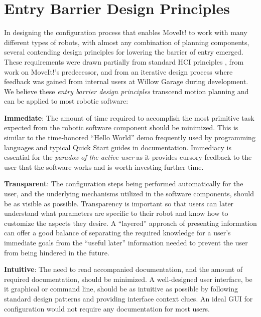 \documentclass[10pt,journal,compsoc]{joser1}
\begin{document}
{%
\section{Entry Barrier Design Principles}
\label{sec::requirements}

In designing the configuration process that enables MoveIt! to work with many
different types of robots, with almost any combination of planning components,
several contending design principles for lowering the barrier of entry emerged.
These requirements were drawn partially from standard HCI principles
\cite{galitz2007essential}, from work on MoveIt!'s predecessor, and from an
iterative design process where feedback was gained from internal users at Willow
Garage during development. We believe these \textit{entry barrier design
principles} transcend motion planning and can be applied to most robotic
software:

{\bf Immediate}: The amount of time required to accomplish the most primitive
task expected from the robotic software component should be minimized. This is
similar to the time-honored ``Hello World'' demo frequently used by programming
languages and typical Quick Start guides in documentation. Immediacy is
essential for the \textit{paradox of the active user} as it provides cursory
feedback to the user that the software works and is worth investing further
time.

{\bf Transparent}: The configuration steps being performed automatically for the
user, and the underlying mechanisms utilized in the software components, should
be as visible as possible. Transparency is important so that users can later
understand what parameters are specific to their robot and know how to customize
the aspects they desire. A ``layered'' approach of presenting information can
offer a good balance of separating the required knowledge for a user's immediate
goals from the ``useful later'' information needed to prevent the user from
being hindered in the future.

{\bf Intuitive}: The need to read accompanied documentation, and the amount of
required documentation, should be minimized. A well-designed user interface, be
it graphical or command line, should be as intuitive as possible by following
standard design patterns and providing interface context clues. An ideal GUI for
configuration would not require any documentation for most users.

}
\end{document}
